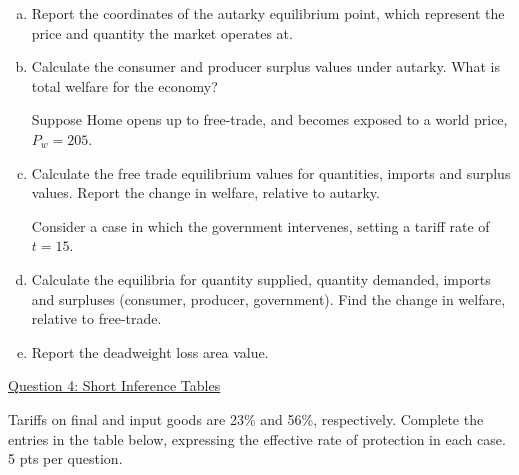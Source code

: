 \documentclass[12pt]{article}
\begin{document}
\begin{enumerate}[a)]
	\item Report the coordinates of the autarky equilibrium point, which represent the price and quantity the market operates at.
	
	\vspace{2in}
	
	\item Calculate the consumer and producer surplus values under autarky.  What is total welfare for the economy?
	
	\vspace{2.5in}
	
	\newpage
	
	\noindent Suppose Home opens up to free-trade, and becomes exposed to a world price, $P_w = 205$. 
	
	\item Calculate the free trade equilibrium values for quantities, imports and surplus values. 
	Report the change in welfare, relative to autarky. 
	
	\vspace{3in}
	
	\noindent Consider a case in which the government intervenes, setting a tariff rate of $t=15$. 
	
	\item Calculate the equilibria for quantity supplied, quantity demanded, imports and surpluses (consumer, producer, government). 
	Find the change in welfare, relative to free-trade. 
	
	\vspace{2in}
	
	\item Report the deadweight loss area value.
	
\end{enumerate}

\newpage

\noindent \underline{Question 4: Short Inference Tables}

\noindent Tariffs on final and input goods are 23\% and 56\%, respectively. Complete the entries in the table below, expressing the effective rate of protection in each case.
5 pts per question. 
\end{document}
